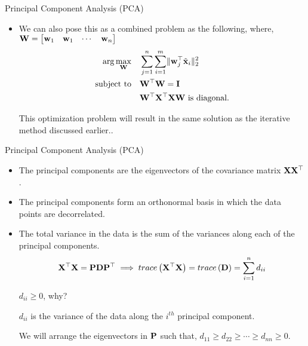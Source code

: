 \documentclass[aspectratio=169]{beamer}
\let\olditem\item
\renewcommand{\item}{\setlength{\itemsep}{\fill}\olditem}
\def\mf{\ensuremath\mathbf}
\def\lp{\ensuremath\left(}
\def\rp{\ensuremath\right)}
\def\bmx{\ensuremath\begin{bmatrix*}[r]}
\def\emx{\ensuremath\end{bmatrix*}}
\begin{document}
\begin{frame}[t]{Principal Component Analysis (PCA)}
\begin{itemize}
  \item We can also pose this as a combined problem as the following, where, $\mf{W} = \bmx \mf{w}_1 & \mf{w}_1 & \cdots & \mf{w}_n\emx$ 
  \begin{align*}
    \arg\underset{\mf{W}}{\max}  \quad & \sum_{j=1}^n \sum_{i=1}^m \lVert \mf{w}_j^\top\tilde{\mf{x}}_i \rVert_2^2 \\
      \text{subject to} \quad & \mf{W}^\top\mf{W} = \mf{I}\\
      & \mf{W}^\top\mf{X}^\top\mf{X}\mf{W} \text{ is diagonal.} 
  \end{align*}

  This optimization problem will result in the same solution as the iterative method discussed earlier..
\end{itemize}
\end{frame}


\begin{frame}[t]{Principal Component Analysis (PCA)}
\begin{itemize}
  \item The principal components are the eigenvectors of the covariance matrix $\mf{X}\mf{X}^\top$.
  
  \item The principal components form an orthonormal basis in which the data points are decorrelated.
  
  \item The total variance in the data is the sum of the variances along each of the principal components.
  \[ \mf{X}^\top\mf{X} = \mf{P} \mf{D} \mf{P}^\top \implies trace\lp \mf{X}^\top\mf{X} \rp = trace\lp \mf{D} \rp = \sum_{i=1}^n d_{ii} \]
  
  $d_{ii} \geq 0$, why? 
  
  $d_{ii}$ is the variance of the data along the $i^{th}$ principal component.

  We will arrange the eigenvectors in $\mf{P}$ such that, $d_{11} \geq d_{22} \geq \cdots \geq d_{nn} \geq 0$.
\end{itemize}
\end{frame}
\end{document}
